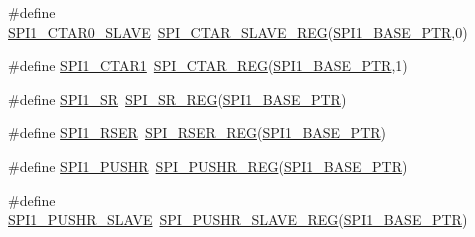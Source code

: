 \begin{DoxyCompactItemize}
\item 
\#define \hyperlink{group___s_p_i___register___accessor___macros_ga251fb8689b81993c65343a87974470b2}{S\+P\+I1\+\_\+\+C\+T\+A\+R0\+\_\+\+S\+L\+A\+VE}~\hyperlink{group___s_p_i___register___accessor___macros_ga2025336cecfcf0c5b7cdb30e8056505b}{S\+P\+I\+\_\+\+C\+T\+A\+R\+\_\+\+S\+L\+A\+V\+E\+\_\+\+R\+EG}(\hyperlink{group___s_p_i___peripheral_gae28fd789e0602a32076c1c13ca39f5af}{S\+P\+I1\+\_\+\+B\+A\+S\+E\+\_\+\+P\+TR},0)
\item 
\#define \hyperlink{group___s_p_i___register___accessor___macros_gaacd2d301feeca18f4cc3fd3d5b0d1371}{S\+P\+I1\+\_\+\+C\+T\+A\+R1}~\hyperlink{group___s_p_i___register___accessor___macros_ga5ab762c9000b796d14c1ce822eefc436}{S\+P\+I\+\_\+\+C\+T\+A\+R\+\_\+\+R\+EG}(\hyperlink{group___s_p_i___peripheral_gae28fd789e0602a32076c1c13ca39f5af}{S\+P\+I1\+\_\+\+B\+A\+S\+E\+\_\+\+P\+TR},1)
\item 
\#define \hyperlink{group___s_p_i___register___accessor___macros_ga2b19fcaa36c268e02998a7719d021bac}{S\+P\+I1\+\_\+\+SR}~\hyperlink{group___s_p_i___register___accessor___macros_ga0621f5a9016db52860125b33dd3519a2}{S\+P\+I\+\_\+\+S\+R\+\_\+\+R\+EG}(\hyperlink{group___s_p_i___peripheral_gae28fd789e0602a32076c1c13ca39f5af}{S\+P\+I1\+\_\+\+B\+A\+S\+E\+\_\+\+P\+TR})
\item 
\#define \hyperlink{group___s_p_i___register___accessor___macros_ga12df97e0d55761a6643307e86ee4f61c}{S\+P\+I1\+\_\+\+R\+S\+ER}~\hyperlink{group___s_p_i___register___accessor___macros_ga9f132bbe51ac921e48eb67afd580ed34}{S\+P\+I\+\_\+\+R\+S\+E\+R\+\_\+\+R\+EG}(\hyperlink{group___s_p_i___peripheral_gae28fd789e0602a32076c1c13ca39f5af}{S\+P\+I1\+\_\+\+B\+A\+S\+E\+\_\+\+P\+TR})
\item 
\#define \hyperlink{group___s_p_i___register___accessor___macros_gab08a3e3e7fb1676acd598bad6f4c2bf1}{S\+P\+I1\+\_\+\+P\+U\+S\+HR}~\hyperlink{group___s_p_i___register___accessor___macros_gacca7ae364ed1cf69ce3a13c76691ce63}{S\+P\+I\+\_\+\+P\+U\+S\+H\+R\+\_\+\+R\+EG}(\hyperlink{group___s_p_i___peripheral_gae28fd789e0602a32076c1c13ca39f5af}{S\+P\+I1\+\_\+\+B\+A\+S\+E\+\_\+\+P\+TR})
\item 
\#define \hyperlink{group___s_p_i___register___accessor___macros_ga077478cca0677739d69de298b0e81c83}{S\+P\+I1\+\_\+\+P\+U\+S\+H\+R\+\_\+\+S\+L\+A\+VE}~\hyperlink{group___s_p_i___register___accessor___macros_gab2be31eae2e6d72caaac8897ed48099f}{S\+P\+I\+\_\+\+P\+U\+S\+H\+R\+\_\+\+S\+L\+A\+V\+E\+\_\+\+R\+EG}(\hyperlink{group___s_p_i___peripheral_gae28fd789e0602a32076c1c13ca39f5af}{S\+P\+I1\+\_\+\+B\+A\+S\+E\+\_\+\+P\+TR})

\end{DoxyCompactItemize}
